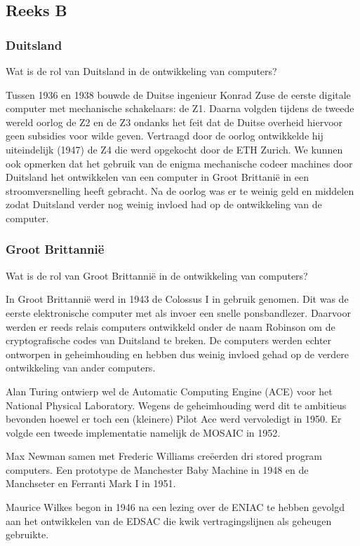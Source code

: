 \documentclass[../main.tex]{subfiles}
\begin{document}
\subsection{Reeks B}
\subsubsection{Duitsland}
\begin{question}
Wat is de rol van Duitsland in de ontwikkeling van computers?
\end{question}
\begin{solution}
Tussen 1936 en 1938 bouwde de Duitse ingenieur Konrad Zuse de eerste digitale computer met mechanische schakelaars: de Z1.
Daarna volgden tijdens de tweede wereld oorlog de Z2 en de Z3 ondanks het feit dat de Duitse overheid hiervoor geen subsidies voor wilde geven.
Vertraagd door de oorlog ontwikkelde hij uiteindelijk (1947) de Z4 die werd opgekocht door de ETH Zurich.
We kunnen ook opmerken dat het gebruik van de enigma mechanische codeer machines door Duitsland het ontwikkelen van een computer in Groot Brittani\"e in een stroomversnelling heeft gebracht.
Na de oorlog was er te weinig geld en middelen zodat Duitsland verder nog weinig invloed had op de ontwikkeling van de computer.
\end{solution}

\subsubsection{Groot Brittanni\"e}
\begin{question}
Wat is de rol van Groot Brittanni\"e in de ontwikkeling van computers?
\end{question}
\begin{solution}
In Groot Brittanni\"e werd in 1943 de Colossus I in gebruik genomen. Dit was de eerste elektronische computer met als invoer een snelle ponsbandlezer. 
Daarvoor werden er reeds relais computers ontwikkeld onder de naam Robinson om de cryptografische codes van Duitsland te breken.
De computers werden echter ontworpen in geheimhouding en hebben dus weinig invloed gehad op de verdere ontwikkeling van ander computers.

Alan Turing ontwierp wel de Automatic Computing Engine (ACE) voor het National Physical Laboratory. 
Wegens de geheimhouding werd dit te ambitieus bevonden hoewel er toch een (kleinere) Pilot Ace werd vervoledigt in 1950.
Er volgde een tweede implementatie namelijk de MOSAIC in 1952.

Max Newman samen met Frederic Williams cre\"eerden dri stored program computers.
Een prototype de Manchester Baby Machine in 1948 en de Manchseter en Ferranti Mark I in 1951.

Maurice Wilkes  begon in 1946 na een lezing over de ENIAC te hebben gevolgd aan het ontwikkelen van de EDSAC die kwik vertragingslijnen als geheugen gebruikte.
\end{solution}
\end{document}

